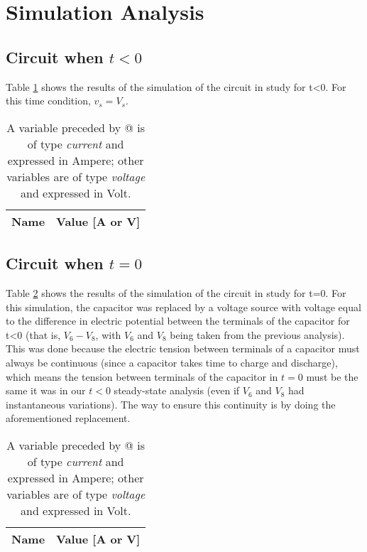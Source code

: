 \section{Simulation Analysis}
\label{sec:simulation}

\subsection{Circuit when $t<0$}

Table \ref{tab:t<0_sim} shows the results of the simulation of the circuit in study for t<0. For this time condition, $v_s = V_s$.

\begin{table}[h]
  \centering
  \begin{tabular}{|l|r|}
    \hline    
    {\bf Name} & {\bf Value [A or V]} \\ \hline
    
  \end{tabular}
  \caption{A variable preceded by @ is of type {\em current}
    and expressed in Ampere; other variables are of type {\it voltage} and expressed in
    Volt.}
  \label{tab:t<0_sim}
\end{table}


\subsection{Circuit when $t=0$}

Table \ref{tab:t=0_sim} shows the results of the simulation of the circuit in study for t=0. For this simulation, the capacitor was replaced by a voltage source with voltage equal to the difference in electric potential between the terminals of the capacitor for t<0 (that is, $V_6 - V_8$, with $V_6$ and $V_8$ being taken from the previous analysis). This was done because the electric tension between terminals of a capacitor must always be continuous (since a capacitor takes time to charge and discharge), which means the tension between terminals of the capacitor in $t=0$ must be the same it was in our $t<0$ steady-state analysis (even if $V_6$ and $V_8$ had instantaneous variations). The way to ensure this continuity is by doing the aforementioned replacement.

\begin{table}[h]
  \centering
  \begin{tabular}{|l|r|}
    \hline    
    {\bf Name} & {\bf Value [A or V]} \\ \hline
    
  \end{tabular}
  \caption{A variable preceded by @ is of type {\em current}
    and expressed in Ampere; other variables are of type {\it voltage} and expressed in
    Volt.}
  \label{tab:t=0_sim}
\end{table}



